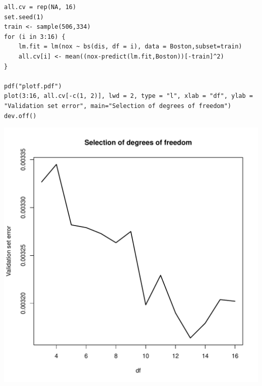 \documentclass[11pt, a4paper]{article}
\begin{document}
\begin{verbatim}
all.cv = rep(NA, 16)
set.seed(1)
train <- sample(506,334)
for (i in 3:16) {
    lm.fit = lm(nox ~ bs(dis, df = i), data = Boston,subset=train)
    all.cv[i] <- mean((nox-predict(lm.fit,Boston))[-train]^2)
}

pdf("plotf.pdf")
plot(3:16, all.cv[-c(1, 2)], lwd = 2, type = "l", xlab = "df", ylab = "Validation set error", main="Selection of degrees of freedom")
dev.off()
\end{verbatim}

\includegraphics[scale=0.6]{plotf.pdf}
\end{document}
